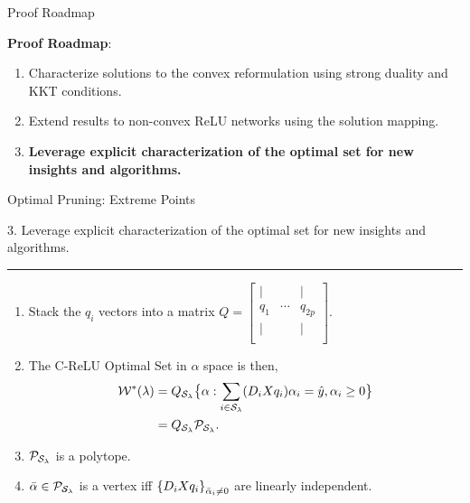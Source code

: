 \documentclass[usenames,dvipsnames,mathserif,notheorems]{beamer}
\newcommand{\horizontalrule}{
	{
			\vspace{-0.5em}
			\center \rule{\textwidth}{0.1em}
			\vspace{-0.2em}
		}
}
\newcommand{\bad}[1]{\textcolor{bad}{#1}}
\newcommand{\good}[1]{\textcolor{good}{#1}}
\begin{document}
\begin{frame}{Proof Roadmap}

	\textbf{\Large Proof Roadmap}:
	\vspace{2em}

	\begin{enumerate}
		\large
		\item Characterize solutions to the \good{convex reformulation}
		      using strong duality and KKT conditions.
		      \vspace{1ex}

		\item Extend results to \bad{non-convex} ReLU networks
		      using the solution mapping.
		      \vspace{1ex}

		\item \textbf{Leverage explicit characterization of the optimal
			      set for \good{new insights and algorithms}.}
	\end{enumerate}
\end{frame}

\begin{frame}{Optimal Pruning: Extreme Points}

	{\raggedright
		\large
		3. Leverage explicit characterization of the optimal
		set for \good{new insights and algorithms}.
		\pause
	}

	\horizontalrule
	\begin{enumerate}
		\item
		      Stack the \( q_i \) vectors into a matrix \( Q =
		      \begin{bmatrix}
			      \vert &        & \vert  \\
			      q_1   & \cdots & q_{2p} \\
			      \vert &        & \vert  \\
		      \end{bmatrix}.
		      \)

		      \pause
		\item
		      The C-ReLU Optimal Set in \( \alpha \) space is then,
		      \begin{equation}
			      \begin{aligned}
				      \mathcal{W}^*(\lambda) & =
				      Q_{\mathcal{S}_\lambda} \big\{ \alpha  : \sum_{i \in \mathcal{S}_\lambda} (D_i X q_i) \alpha_i = \hat y,
				      \alpha_i \geq 0
				      \big\}                                                       \\
				                      & = Q_{\mathcal{S}_\lambda} \mathcal{P}_{\mathcal{S}_\lambda}.
			      \end{aligned}
		      \end{equation}

		      \pause

		\item \( \mathcal{P}_{\mathcal{S}_\lambda} \) is a polytope.
		      \pause

		\item \( \bar \alpha \in \mathcal{P}_{\mathcal{S}_\lambda} \) is a vertex
		      iff \( \left\{D_i X q_i\right\}_{\bar \alpha_i \neq 0} \) are linearly independent.
	\end{enumerate}

\end{frame}
\end{document}
